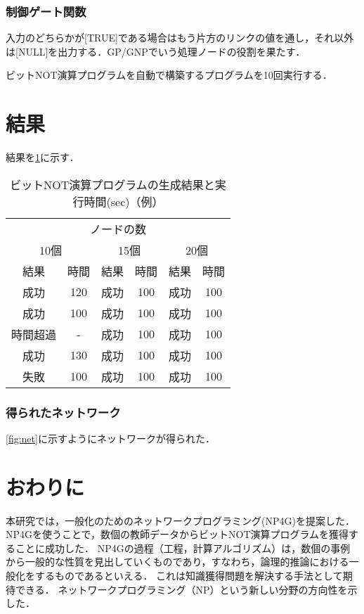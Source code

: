 \documentclass[exploratorypaper]{jsaiart} %
\begin{document}
\subsubsection{制御ゲート関数}
入力のどちらかが[TRUE]である場合はもう片方のリンクの値を通し，それ以外は[NULL]を出力する．GP/GNPでいう処理ノードの役割を果たす．


ビットNOT演算プログラムを自動で構築するプログラムを10回実行する．
\section{結果}
結果を\ref{tbl:result}に示す．

\begin{table}[htbp]
\centering
\caption{ビットNOT演算プログラムの生成結果と実行時間(sec)（例）}
\label{tbl:result}
\begin{tabular}{cc|cc|cc}
    \hline
    \multicolumn{6}{c}{ノードの数} \\
    \multicolumn{2}{c}{10個} & \multicolumn{2}{c}{15個} & \multicolumn{2}{c}{20個} \\
    \hline
    結果 & 時間 & 結果 & 時間 & 結果 & 時間 \\
    \hline
    成功 & 120 & 成功 & 100 & 成功 & 100\\
    成功 & 100  & 成功 & 100 & 成功 & 100\\
    時間超過 & -  & 成功 & 100 & 成功 & 100\\
    成功 & 130  & 成功 & 100 & 成功 & 100\\
    失敗 & 100  & 成功 & 100 & 成功 & 100\\
    \hline
\end{tabular}
\end{table}

\subsubsection{得られたネットワーク}
\ref{fig:net}に示すようにネットワークが得られた．


\section{おわりに}
本研究では，一般化のためのネットワークプログラミング(NP4G)を提案した．NP4Gを使うことで，数個の教師データからビットNOT演算プログラムを獲得することに成功した．
NP4Gの過程（工程，計算アルゴリズム）は，数個の事例から一般的な性質を見出していくものであり，すなわち，論理的推論における一般化をするものであるといえる．
これは知識獲得問題を解決する手法として期待できる．
ネットワークプログラミング（NP）という新しい分野の方向性を示した．
\end{document}
